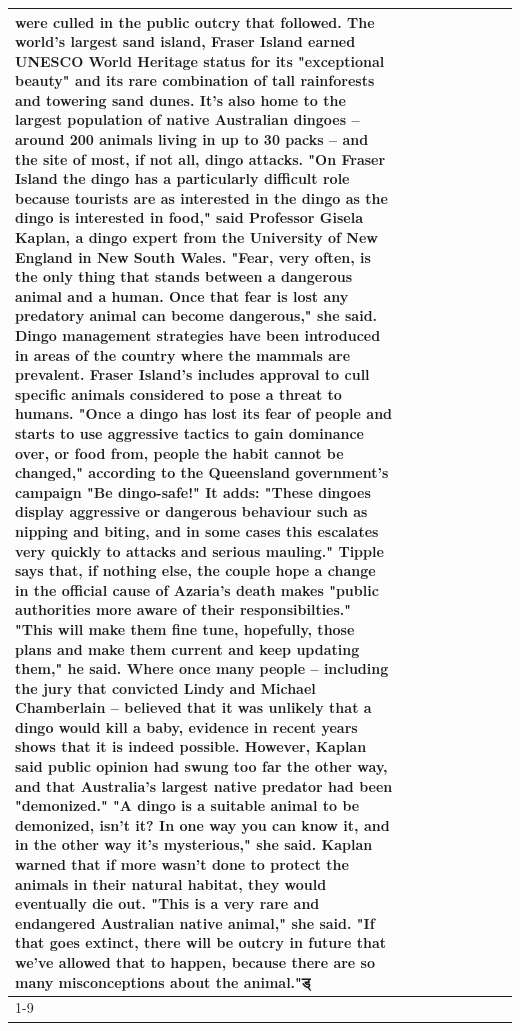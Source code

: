\begin{table}[H]
\begin{tabular}{lllrlllll}
were culled in the public outcry that followed. The world's largest sand island, Fraser Island earned UNESCO World Heritage status for its "exceptional beauty" and its rare combination of tall rainforests and towering sand dunes. It's also home to the largest population of native Australian dingoes -- around 200 animals living in up to 30 packs -- and the site of most, if not all, dingo attacks. "On Fraser Island the dingo has a particularly difficult role because tourists are as interested in the dingo as the dingo is interested in food," said Professor Gisela Kaplan, a dingo expert from the University of New England in New South Wales. "Fear, very often, is the only thing that stands between a dangerous animal and a human. Once that fear is lost any predatory animal can become dangerous," she said. Dingo management strategies have been introduced in areas of the country where the mammals are prevalent. Fraser Island's includes approval to cull specific animals considered to pose a threat to humans. "Once a dingo has lost its fear of people and starts to use aggressive tactics to gain dominance over, or food from, people the habit cannot be changed," according to the Queensland government's campaign "Be dingo-safe!" It adds: "These dingoes display aggressive or dangerous behaviour such as nipping and biting, and in some cases this escalates very quickly to attacks and serious mauling." Tipple says that, if nothing else, the couple hope a change in the official cause of Azaria's death makes "public authorities more aware of their responsibilties." "This will make them fine tune, hopefully, those plans and make them current and keep updating them," he said. Where once many people -- including the jury that convicted Lindy and Michael Chamberlain -- believed that it was unlikely that a dingo would kill a baby, evidence in recent years shows that it is indeed possible. However, Kaplan said public opinion had swung too far the other way, and that Australia's largest native predator had been "demonized." "A dingo is a suitable animal to be demonized, isn't it? In one way you can know it, and in the other way it's mysterious," she said. Kaplan warned that if more wasn't done to protect the animals in their natural habitat, they would eventually die out. "This is a very rare and endangered Australian native animal," she said. "If that goes extinct, there will be outcry in future that we've allowed that to happen, because there are so many misconceptions about the animal."ड् \\
\cline{1-9}

\end{tabular}
\end{table}
